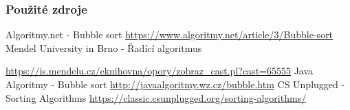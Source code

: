 \documentclass[11pt, hyperref={unicode}]{beamer}
\begin{document}
    \begin{frame}
        \frametitle{Použité zdroje}
        \begin{thebibliography}{99}
           Algoritmy.net - Bubble sort
            \url{https://www.algoritmy.net/article/3/Bubble-sort}
           Mendel University in Brno - Řadící algoritmus
              
            \url{https://is.mendelu.cz/eknihovna/opory/zobraz_cast.pl?cast=65555}
           Java Algoritmy - Bubble sort
            \url{http://javaalgoritmy.wz.cz/bubble.htm}
           CS Unplugged - Sorting Algorithms
            \url{https://classic.csunplugged.org/sorting-algorithms/}
        \end{thebibliography}
    \end{frame}
\end{document}
